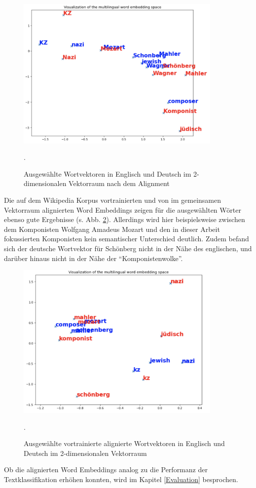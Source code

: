 \documentclass[ngerman]{ttlab-qualify}
\begin{document}
\begin{figure}[H]
\begin{center}
\includegraphics[width=10cm]{grafiken/after_alignment.png}
\caption[Ausgewählte Wortvektoren in Englisch und Deutsch im 2-dimensionalen Vektorraum nach dem Alignment]{Ausgewählte Wortvektoren in Englisch und Deutsch im 2-dimensionalen Vektorraum nach dem Alignment}.
\label{After_Alignment}
\end{center}
\end{figure} 
\noindent Die auf dem Wikipedia Korpus vortrainierten und von \textcite{conneau2017word} im gemeinsamen Vektorraum alignierten Word Embeddings zeigen für die ausgewählten Wörter ebenso gute Ergebnisse (s. Abb. \ref{Pretrained_aligned}). Allerdings wird hier beispielsweise zwischen dem Komponisten Wolfgang Amadeus Mozart und den in dieser Arbeit fokussierten Komponisten kein semantischer Unterschied deutlich. Zudem befand sich der deutsche Wortvektor für Schönberg nicht in der Nähe des englischen, und darüber hinaus nicht in der Nähe der "`Komponistenwolke"'.\\
\begin{figure}[H]
\begin{center}
\includegraphics[width=10cm]{grafiken/pretrained_aligned.png}
\caption[Ausgewählte vortrainierte alignierte Wortvektoren in Englisch und Deutsch im 2-dimensionalen Vektorraum]{Ausgewählte vortrainierte alignierte Wortvektoren in Englisch und Deutsch im 2-dimensionalen Vektorraum}.
\label{Pretrained_aligned}
\end{center}
\end{figure}
\noindent Ob die alignierten Word Embeddings analog zu \textcite{jiang2019cross} die Performanz der Textklassifikation erhöhen konnten, wird im Kapitel \ref{Evaluation} besprochen.
\end{document}
